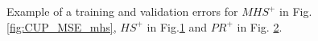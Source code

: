\begin{appendices}
\begin{figure}[H]
\begin{subfigure}{0.40\textwidth}
{                    }
                    \caption{}
                    \label{fig:CUP_MSE_hs}
                \end{subfigure}
                \begin{subfigure}{0.40\textwidth}
                    \caption{}
                    \label{fig:CUP_MSE_pr}
                \end{subfigure}
                \caption{Example of a training and validation errors for $MHS^+$ in Fig.\ref{fig:CUP_MSE_mhs}, $HS^+$ in Fig.\ref{fig:CUP_MSE_hs} and $PR^+$ in Fig. \ref{fig:CUP_MSE_pr}.}
                \label{fig:cup_CGD}
            \end{figure}


\end{appendices}
